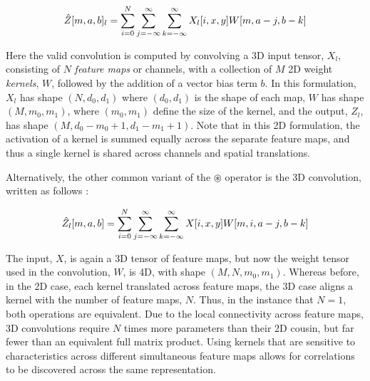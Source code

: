 \begin{equation}
\label{eq:convolution}
\small
\hat{Z}[m, a, b]_l =\sum_{i=0}^{N} \sum_{j=-\infty}^{\infty} \sum_{k=-\infty}^{\infty} X_l[i, x, y]W[m, a - j, b - k]
\end{equation}

\noindent Here the valid convolution is computed by convolving a 3D input tensor, $X_l$, consisting of $N$ \emph{feature maps} or channels, with a collection of $M$ 2D weight \emph{kernels}, $W$, followed by the addition of a vector bias term $b$.
In this formulation, $X_l$ has shape $(N, d_0, d_1)$ where $(d_0,d_1)$ is the shape of each map, $W$ has shape $(M, m_0, m_1)$, where $(m_0,m_1)$ define the size of the kernel, and the output, $Z_l$, has shape $(M, d_0-m_0+1, d_1-m_1+1)$.
Note that in this 2D formulation, the activation of a kernel is summed equally across the separate feature maps, and thus a single kernel is shared across channels and spatial translations.

Alternatively, the other common variant of the $\circledast$ operator is the 3D convolution, written as follows \cite{Bengio2011What}:

\begin{equation}
\label{eq:convolution}
\small
\hat{Z}_l[m, a, b] =\sum_{i=0}^{N} \sum_{j=-\infty}^{\infty} \sum_{k=-\infty}^{\infty} X[i, x, y]W[m, i, a - j, b - k]
\end{equation}

\noindent The input, $X$, is again a 3D tensor of feature maps, but now the weight tensor used in the convolution, $W$, is 4D, with shape $(M, N, m_0, m_1)$.
Whereas before, in the 2D case, each kernel translated across feature maps, the 3D case aligns a kernel with the number of feature maps, $N$.
Thus, in the instance that $N=1$, both operations are equivalent.
Due to the local connectivity across feature maps, 3D convolutions require $N$ times more parameters than their 2D cousin, but far fewer than an equivalent full matrix product.
Using kernels that are sensitive to characteristics across different simultaneous feature maps allows for correlations to be discovered across the same representation.




